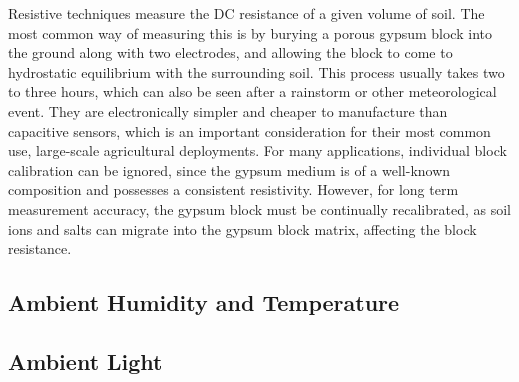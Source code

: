 
Resistive techniques measure the DC resistance of a given volume of soil. The most common way of measuring this is by burying a porous gypsum block into the ground along with two electrodes, and allowing the block to come to hydrostatic equilibrium with the surrounding soil. This process usually takes two to three hours, which can also be seen after a rainstorm or other meteorological event. They are electronically simpler and cheaper to manufacture than capacitive sensors, which is an important consideration for their most common use, large-scale agricultural deployments. For many applications, individual block calibration can be ignored, since the gypsum medium is of a well-known composition and possesses a consistent resistivity. However, for long term measurement accuracy, the gypsum block must be continually recalibrated, as soil ions and salts can migrate into the gypsum block matrix, affecting the block resistance.


\subsection{Ambient Humidity and Temperature}

\subsection{Ambient Light}



